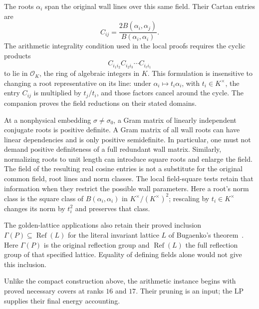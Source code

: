 The roots $\alpha_i$ span the original wall lines over this same field.
Their Cartan entries are
\begin{equation}\label{a:cartan}
 C_{ij}=\frac{2B(\alpha_i,\alpha_j)}{B(\alpha_i,\alpha_i)}.
\end{equation}
The arithmetic integrality condition used in the local proofs requires
the cyclic products
\begin{equation}\label{a:cycles}
             C_{i_1i_2}C_{i_2i_3}\cdots C_{i_\ell i_1}
\end{equation}
to lie in $\mathcal O_K$, the ring of algebraic integers in $K$.
This formulation is insensitive to changing a root representative on
its line: under $\alpha_i\mapsto t_i\alpha_i$, with $t_i\in K^\times$,
the entry $C_{ij}$ is
multiplied by $t_j/t_i$, and those factors cancel around the cycle.
The companion proves the field reductions on their stated domains.

At a nonphysical embedding $\sigma\ne\sigma_0$, a Gram matrix of
linearly independent conjugate roots is positive definite. A Gram matrix
of all wall roots can have linear dependencies and is only positive
semidefinite. In particular, one must not demand positive definiteness
of a full redundant wall matrix. Similarly, normalizing roots to unit
length can introduce square roots and enlarge the field. The field of
the resulting real cosine entries is not a substitute for the original
common field, root lines and norm classes. The local field-square tests
retain that information when they restrict the possible wall parameters.
Here a root's norm class is the square class of
$B(\alpha_i,\alpha_i)$ in $K^\times/(K^\times)^2$; rescaling by
$t_i\in K^\times$ changes its norm by $t_i^2$ and preserves that class.

The golden-lattice applications also retain their proved inclusion
$\Gamma(P)\subseteq\operatorname{Ref}(L)$ for the literal invariant
lattice $L$ of Bugaenko's theorem~\cite{Bugaenko1984}. Here $\Gamma(P)$
is the original reflection group and $\operatorname{Ref}(L)$ the full
reflection group of that specified lattice. Equality of defining
fields alone would not give this inclusion.

Unlike the compact construction above, the arithmetic instance begins
with proved necessary covers at ranks $16$ and $17$. Their pruning is
an input; the LP supplies their final energy accounting.

